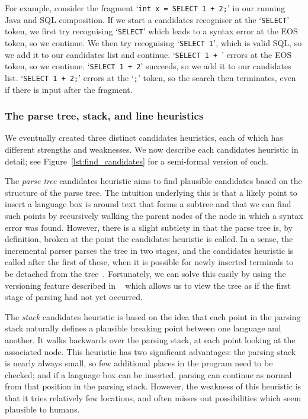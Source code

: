 \documentclass[sigplan,screen]{acmart}\settopmatter{printfolios=true,printccs=false,printacmref=false}
\begin{document}
For example, consider the fragment `\texttt{int x = SELECT 1 + 2;}' in our
running Java and SQL composition. If we start a candidates recogniser at the
`\texttt{SELECT}' token, we first try recognising `\texttt{SELECT}' which leads
to a syntax error at the EOS token, so we continue. We then try recognising
`\texttt{SELECT 1}', which is valid SQL, so we add it to our candidates list
and continue. `\texttt{SELECT 1 + }' errors at the EOS token, so we continue.
`\texttt{SELECT 1 + 2}' succeeds, so we add it to our candidates list.
`\texttt{SELECT 1 + 2;}' errors at the `\texttt{;}' token, so the search then
terminates, even if there is input after the fragment.


\subsubsection{The parse tree, stack, and line heuristics}

We eventually created three distinct candidates heuristics, each of which has
different strengths and weaknesses. We now describe each candidates heuristic
in detail; see Figure~\ref{lst:find_candidates} for a semi-formal version of
each.

The \emph{parse tree} candidates heuristic aims to
find plausible candidates based on the structure of the parse tree. The
intuition underlying this is that a likely point to insert a language box is
around text that forms a subtree and that we can find such points by
recursively walking the parent nodes of the node in which a syntax error was
found. However, there is a slight subtlety in that the parse tree is, by
definition, broken at the point the candidates heuristic is called. In a sense,
the incremental parser parses the tree in two stages, and the candidates
heuristic is called after the first of these, when it is possible for newly
inserted terminals to be detached from the tree~\cite[p.~58, 60]{wagner98practicalalgorithms}. Fortunately, we can solve this
easily by using the versioning feature described in ~\citet[p.~15]{wagner98practicalalgorithms}
which allows
us to view the tree as if the first stage of parsing had not yet occurred.

The \emph{stack} candidates heuristic is based on
the idea that each point in the parsing stack naturally defines a plausible
breaking point between one language and another. It walks backwards over the
parsing stack, at each point looking at the associated node. This heuristic has
two significant
advantages: the parsing stack is nearly always small, so few additional
places in the program need to be checked; and if a language box can be
inserted, parsing can continue as normal from that position in the parsing
stack. However, the weakness of this heuristic is that it tries relatively few
locations, and often misses out possibilities which seem plausible to humans.
\end{document}
